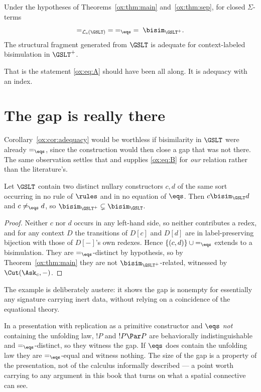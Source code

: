 \begin{corollary}
\label{ox:cor:adequacy}
Under the hypotheses of Theorems~\ref{ox:thm:main} and~\ref{ox:thm:sep}, for closed
$\Sigma$-terms
\[
  =_{\mathcal{L}_{\mathrm{s}}(\GSLT)} \;=\; =_{\eqs} \;=\; \bisim_{\GSLT^{+}} .
\]
The structural fragment generated from $\GSLT$ is adequate for context-labeled
bisimulation in $\GSLT^{+}$.
\end{corollary}

That is the statement \eqref{ox:eq:A} should have been all along. It is adequacy
with an index.

\section{The gap is really there}
\label{ox:sec:nonvac}

Corollary~\ref{ox:cor:adequacy} would be worthless if bisimilarity in $\GSLT$ were
already $=_{\eqs}$, since the construction would then close a gap that was not
there. The same observation settles that and supplies \eqref{ox:eq:B} for
\emph{our} relation rather than the literature's.

\begin{proposition}
\label{ox:prop:nonvac}
Let $\GSLT$ contain two distinct nullary constructors $c,d$ of the same sort
occurring in no rule of $\rules$ and in no equation of $\eqs$. Then
$c \bisim_{\GSLT} d$ and $c \neq_{\eqs} d$, so
$\bisim_{\GSLT^{+}} \subsetneq \bisim_{\GSLT}$.
\end{proposition}

\begin{proof}
Neither $c$ nor $d$ occurs in any left-hand side, so neither contributes a redex,
and for any context $D$ the transitions of $D[c]$ and $D[d]$ are in
label-preserving bijection with those of $D[-]$'s own redexes. Hence
$\{(c,d)\} \cup {=_{\eqs}}$ extends to a bisimulation. They are $=_{\eqs}$-distinct
by hypothesis, so by Theorem~\ref{ox:thm:main} they are not
$\bisim_{\GSLT^{+}}$-related, witnessed by $\Cut(\Ask_c,-)$.
\end{proof}

The example is deliberately austere: it shows the gap is nonempty for essentially
any signature carrying inert data, without relying on a coincidence of the
equational theory.

\begin{example}
\label{ox:ex:replication}
In a presentation with replication as a primitive constructor and $\eqs$
\emph{not} containing the unfolding law, $!P$ and $!P \Par P$ are behaviorally
indistinguishable and $=_{\eqs}$-distinct, so they witness the gap. If $\eqs$ does
contain the unfolding law they are $=_{\eqs}$-equal and witness nothing. The size
of the gap is a property of the presentation, not of the calculus informally
described --- a point worth carrying to any argument in this book that turns on
what a spatial connective can see.
\end{example}

